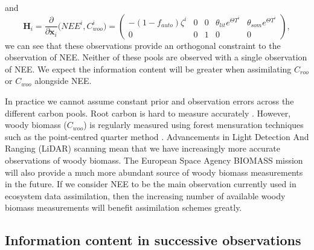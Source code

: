 and
\begin{equation}
\textbf{H}_{i} = \frac{\partial}{\partial \textbf{x}_{i}}\big(NEE^{i}, C_{woo}^{i} \big) =
 \begin{pmatrix}
-(1-f_{auto})\zeta^i & 0 & 0 & \theta_{lit} e^{\Theta T^{i}} & \theta_{som} e^{\Theta T^{i}}\\
0 & 0 & 1 & 0 & 0
\end{pmatrix},
\end{equation}
we can see that these observations provide an orthogonal constraint to the observation of NEE. Neither of these pools are observed with a single observation of NEE. We expect the information content will be greater when assimilating \(C_{roo}\) or \(C_{woo}\) alongside NEE. 

In practice we cannot assume constant prior and observation errors across the different carbon pools. Root carbon is hard to measure accurately \citep{brown2002measuring}. However, woody biomass (\(C_{woo}\)) is regularly measured using  forest mensuration techniques such as the point-centred quarter method \citep{dahdouh2006empirical}. Advancements in Light Detection And Ranging (LiDAR) scanning \citep{Lefsky199983} mean that we have increasingly more accurate observations of woody biomass. The European Space Agency BIOMASS mission \citep{le2011biomass} will also provide a much more abundant source of woody biomass measurements in the future. If we consider NEE to be the main observation currently used in ecosystem data assimilation, then the increasing number of available woody biomass measurements will benefit assimilation schemes greatly.

\subsection{Information content in successive observations} \label{chap5:sec:D1_succ_obs}

